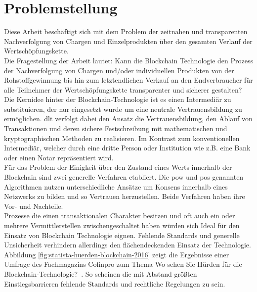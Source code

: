\section{Problemstellung}

Diese Arbeit beschäftigt sich mit dem Problem der zeitnahen und transparenten Nachverfolgung von Chargen und Einzelprodukten über den gesamten Verlauf der Wertschöpfungskette.\\

Die Fragestellung der Arbeit lautet: Kann die Blockchain Technologie den Prozess der Nachverfolgung von Chargen und/oder individuellen Produkten von der Rohstoffgewinnung bis hin zum letztendlichen Verkauf an den Endverbraucher für alle Teilnehmer der Wertschöpfungskette transparenter und sicherer gestalten?\\

Die Kernidee hinter der Blockchain-Technologie ist es einen Intermediär zu substituieren, der nur eingesetzt wurde um eine neutrale Vertrauensbildung zu ermöglichen. \ac{dlt} verfolgt dabei den Ansatz die Vertrauensbildung, den Ablauf von Transaktionen und deren sichere Festschreibung mit mathematischen und kryptographischen Methoden zu realisieren. Im Kontrast zum konventionellen Intermediär, welcher durch eine dritte Person oder Institution wie z.B. eine Bank oder einen Notar repräsentiert wird.\\

Für das Problem der Einigkeit über den Zustand eines Werts innerhalb der Blockchain sind zwei generelle Verfahren etabliert. Die \ac{pow} und \ac{pos} genannten Algorithmen nutzen unterschiedliche Ansätze um Konsens innerhalb eines Netzwerks zu bilden und so Vertrauen herzustellen. Beide Verfahren haben ihre Vor- und Nachteile.\\

Prozesse die einen transaktionalen Charakter besitzen und oft auch ein oder mehrere Vermittlerstellen zwischengeschaltet haben würden sich Ideal für den Einsatz von Blockchain Technologie eignen. Fehlende Standards und generelle Unsicherheit verhindern allerdings den flächendeckenden Einsatz der Technologie.\\

Abbildung \ref{fig:statista-huerden-blockchain-2016} zeigt die Ergebnisse einer Umfrage des Fachmagazins Cofinpro zum Thema \glqq Wo sehen Sie Hürden für die Blockchain-Technologie?\grqq~. So scheinen die mit Abstand größten Einstiegsbarrieren fehlende Standards und rechtliche Regelungen zu sein.


